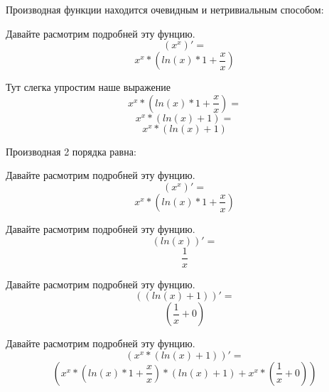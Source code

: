 \documentclass[a4paper,12pt]{article}
\begin{document}
Производная функции находится очевидным и нетривиальным способом:

Давайте расмотрим подробней эту фунцию.
\begin{equation}
\left( {x }^ {x }\right)' =
\end{equation}
\begin{equation}
{{x }^ {x }}* {\left( {{ln \left( {x }\right) }* {1 }}+ {\frac{{x }}{{x }}}\right) }
\end{equation}

Тут слегка упростим наше выражение
\begin{equation}
{{x }^ {x }}* {\left( {{ln \left( {x }\right) }* {1 }}+ {\frac{{x }}{{x }}}\right) }=
\end{equation}
\begin{equation}
{{x }^ {x }}* {\left( {ln \left( {x }\right) }+ {1 }\right) }=
\end{equation}
\begin{equation}
{{x }^ {x }}* {\left( {ln \left( {x }\right) }+ {1 }\right) }
\end{equation}

Производная 2 порядка равна:

Давайте расмотрим подробней эту фунцию.
\begin{equation}
\left( {x }^ {x }\right)' =
\end{equation}
\begin{equation}
{{x }^ {x }}* {\left( {{ln \left( {x }\right) }* {1 }}+ {\frac{{x }}{{x }}}\right) }
\end{equation}

Давайте расмотрим подробней эту фунцию.
\begin{equation}
\left( ln \left( {x }\right) \right)' =
\end{equation}
\begin{equation}
\frac{{1 }}{{x }}
\end{equation}

Давайте расмотрим подробней эту фунцию.
\begin{equation}
\left( \left( {ln \left( {x }\right) }+ {1 }\right) \right)' =
\end{equation}
\begin{equation}
\left( {\frac{{1 }}{{x }}}+ {0 }\right) 
\end{equation}

Давайте расмотрим подробней эту фунцию.
\begin{equation}
\left( {{x }^ {x }}* {\left( {ln \left( {x }\right) }+ {1 }\right) }\right)' =
\end{equation}
\begin{equation}
\left( {{{{x }^ {x }}* {\left( {{ln \left( {x }\right) }* {1 }}+ {\frac{{x }}{{x }}}\right) }}* {\left( {ln \left( {x }\right) }+ {1 }\right) }}+ {{{x }^ {x }}* {\left( {\frac{{1 }}{{x }}}+ {0 }\right) }}\right) 
\end{equation}
\end{document}

